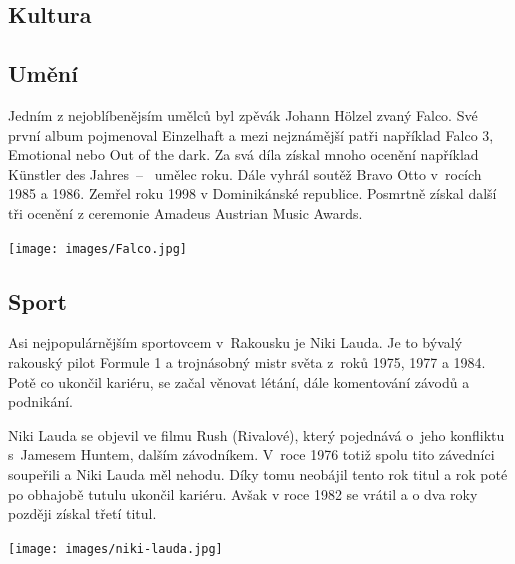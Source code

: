 \documentclass[a2 paper]{article}
\begin{document}
\begin{landscape}
\begin{minipage}[H]{\linewidth}
	\section*{Kultura}
	\begin{minipage}[t]{0.45 \linewidth}
		\begin{minipage}[t]{0.75\linewidth}
			\subsection*{Umění}
			Jedním z nejoblíbenějsím umělců byl zpěvák Johann Hölzel zvaný Falco. Své první album pojmenoval Einzelhaft a mezi nejznámější patři například Falco 3, Emotional nebo Out of the dark. Za svá díla získal mnoho ocenění například Künstler des Jahres~-- ~umělec roku. Dále vyhrál soutěž Bravo Otto v~rocích 1985 a 1986. Zemřel roku 1998 v Dominikánské republice. Posmrtně získal další tři ocenění z ceremonie Amadeus Austrian Music Awards.
		\end{minipage}
	\begin{minipage}[t]{0.2\linewidth}
		\centering
		\texttt{[image: images/Falco.jpg]}
	\end{minipage}
	\end{minipage}
	\begin{minipage}[t]{0.45 \linewidth}
		\begin{minipage}[t]{0.75 \linewidth}
			\subsection*{Sport}
			Asi nejpopulárnějším sportovcem v~Rakousku je Niki Lauda. Je to bývalý rakouský pilot Formule 1 a trojnásobný mistr světa z~roků 1975, 1977 a 1984. Potě co ukončil kariéru, se začal věnovat létání, dále komentování závodů a podnikání. \par
			Niki Lauda se objevil ve filmu Rush (Rivalové), který pojednává o~jeho konfliktu s~Jamesem Huntem, dalším závodníkem. V~roce 1976 totiž spolu tito závedníci soupeřili a Niki Lauda měl nehodu. Díky tomu neobájil tento rok titul a rok poté po obhajobě tutulu ukončil kariéru. Avšak v roce 1982 se vrátil a o dva roky později získal třetí titul.
		\end{minipage}
		\begin{minipage}[t]{0.2 \linewidth}
			\centering
			\texttt{[image: images/niki-lauda.jpg]}
		\end{minipage}
	\end{minipage}
\end{minipage}
\end{landscape}
\end{document}
